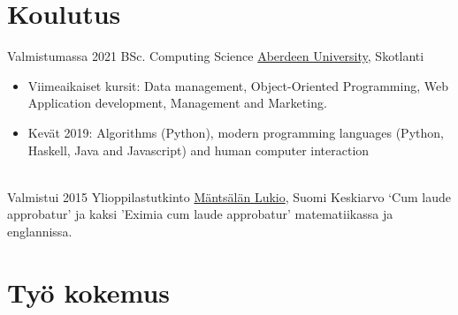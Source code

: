 \documentclass[letterpaper]{twentysecondcvfi} %
\begin{document}
\makeprofile %

\section{Koulutus}
\begin{twenty}
    \twentyitem
        {Valmistumassa}
        {2021}
        {BSc. Computing Science}
        {\href{https://www.abdn.ac.uk/}{Aberdeen University}, Skotlanti}
        {}
            {
            \begin{itemize}
                \item Viimeaikaiset kursit: Data management, Object-Oriented Programming, Web Application development, Management and Marketing.
                \item Kevät 2019: Algorithms (Python), modern programming languages (Python, Haskell, Java and Javascript) and human computer interaction
            \end{itemize}
}\\
\twentyitem
{Valmistui}
{2015}
{Ylioppilastutkinto}
{\href{https://www.abdn.ac.uk/}{Mäntsälän Lukio}, Suomi}
{}
    {
    Keskiarvo ‘Cum laude approbatur’ ja kaksi 'Eximia cum lau­de ap­pro­ba­tur' matematiikassa ja englannissa.
     }
\end{twenty}


\section{Työ kokemus}
\end{document}
